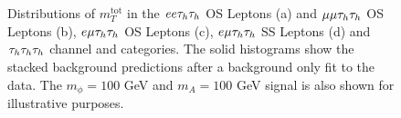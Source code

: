 \begin{figure}[!hbtp]
\centering
     \\
     \\
\caption{Distributions of $m_{T}^\text{tot}$ in the $ee\tau_{h}\tau_{h}$ OS Leptons (a) and $\mu\mu\tau_{h}\tau_{h}$ OS Leptons (b), $e\mu\tau_{h}\tau_{h}$ OS Leptons (c), $e\mu\tau_{h}\tau_{h}$ SS Leptons (d) and $\tau_{h}\tau_{h}\tau_{h}$ channel and categories. The solid histograms show the stacked background predictions after a background only fit to the data. The $m_{\phi}=100$ GeV and $m_{A}=100$ GeV signal is also shown for illustrative purposes.}
\label{fig:4tau_postfit}
\end{figure}

